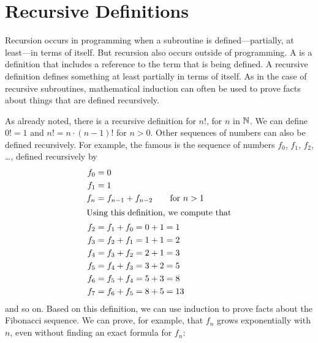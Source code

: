 \section{Recursive Definitions}

Recursion occurs in programming when a subroutine is defined---partially,
at least---in terms of itself.  But recursion also occurs outside of
programming.  A  is a definition that includes
a reference to the term that is being defined.  A recursive definition
defines something at least partially in terms of itself.  As in the
case of recursive subroutines, mathematical induction can often be used
to prove facts about things that are defined recursively.

As already noted, there is a recursive definition for $n!$, for $n$ in ${\mathbb N}$.  We
can define $0!=1$ and $n!=n\cdot(n-1)!$ for $n>0$.  Other sequences of
numbers can also be defined recursively.  For example, the famous
 is the sequence of numbers $f_0$, $f_1$, $f_2$, \dots,
defined recursively by
\begin{align*}
    f_0 &= 0\\
    f_1 &= 1\\
    f_n &= f_{n-1}+f_{n-2} \qquad \text{for $n>1$}\\
\intertext{Using this definition, we compute that}
    f_2 &= f_1 + f_0 = 0 + 1 = 1\\
    f_3 &= f_2 + f_1 = 1 + 1 = 2\\
    f_4 &= f_3 + f_2 = 2 + 1 = 3\\
    f_5 &= f_4 + f_3 = 3 + 2 = 5\\
    f_6 &= f_5 + f_4 = 5 + 3 = 8\\
    f_7 &= f_6 + f_5 = 8 + 5 = 13
\end{align*}
and so on.  Based on this definition, we can use induction to
prove facts about the Fibonacci sequence.  We can prove,
for example, that $f_n$ grows exponentially with $n$, even without
finding an exact formula for $f_n$:

